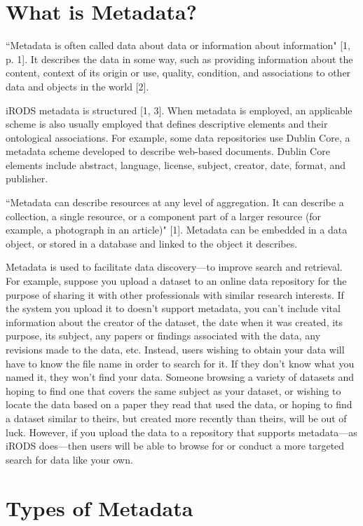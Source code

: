 \documentclass[10pt,oneside]{memoir}
\begin{document}
\section{What is Metadata?}

``Metadata is often called data about data or information about information" [1, p. 1]. It describes the data in some way, such as providing information about the content, context of its origin or use, quality, condition, and associations to other data and objects in the world [2].

iRODS metadata is structured [1, 3]. When metadata is employed, an applicable scheme is also usually employed that defines descriptive elements and their ontological associations. For example, some data repositories use Dublin Core, a metadata scheme developed to describe web-based documents. Dublin Core elements include abstract, language, license, subject, creator, date, format, and publisher.

``Metadata can describe resources at any level of aggregation. It can describe a collection, a single resource, or a component part of a larger resource (for example, a photograph in an article)" [1]. Metadata can be embedded in a data object, or stored in a database and linked to the object it describes.

Metadata is used to facilitate data discovery---to improve search and retrieval. For example, suppose you upload a dataset to an online data repository for the purpose of sharing it with other professionals with similar research interests. If the system you upload it to doesn't support metadata, you can't include vital information about the creator of the dataset, the date when it was created, its purpose, its subject, any papers or findings associated with the data, any revisions made to the data, etc. Instead, users wishing to obtain your data will have to know the file name in order to search for it. If they don't know what you named it, they won't find your data. Someone browsing a variety of datasets and hoping to find one that covers the same subject as your dataset, or wishing to locate the data based on a paper they read that used the data, or hoping to find a dataset similar to theirs, but created more recently than theirs, will be out of luck. However, if you upload the data to a repository that supports metadata---as iRODS does---then users will be able to browse for or conduct a more targeted search for data like your own.

\section{Types of Metadata}
\end{document}
